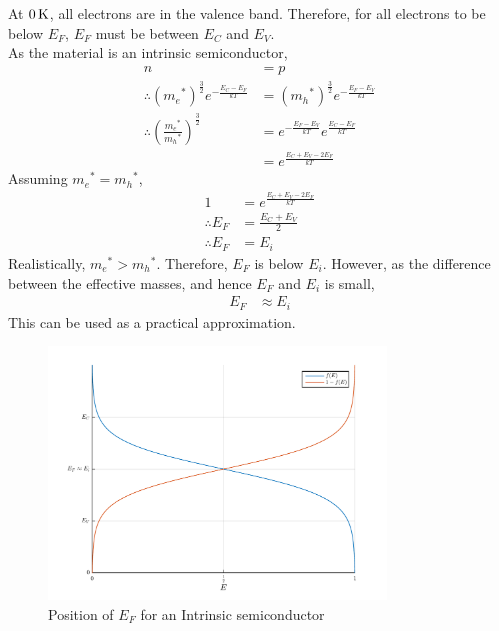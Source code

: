 \documentclass[titlepage, fleqn, a4paper, 12pt, twoside]{article}
\theoremstyle{definition}
\theoremstyle{theorem}
\begin{document}
At $0 \kelvin$, all electrons are in the valence band.
Therefore, for all electrons to be below $E_F$, $E_F$ must be between $E_C$ and $E_V$.\\
As the material is an intrinsic semiconductor,
\begin{align*}
	n                                                                          & = p                                                               \\
	\therefore \left( {m_e}^* \right)^{\frac{3}{2}} e^{-\frac{E_C - E_F}{k T}} & = \left( {m_h}^* \right)^{\frac{3}{2}} e^{-\frac{E_F - E_V}{k T}} \\
	\therefore \left( \frac{{m_e}^*}{{m_h}^*} \right)^{\frac{3}{2}}            & = e^{-\frac{E_F - E_V}{k T}} e^{\frac{E_C - E_F}{k T}}            \\
                                                                                   & = e^{\frac{E_C + E_V - 2 E_F}{k T}}
\end{align*}
Assuming ${m_e}^* = {m_h}^*$,
\begin{align*}
	1              & = e^{\frac{E_C + E_V - 2 E_F}{k T}} \\
	\therefore E_F & = \frac{E_C + E_V}{2}               \\
	\therefore E_F & = E_i
\end{align*}
Realistically, ${m_e}^* > {m_h}^*$.
Therefore, $E_F$ is below $E_i$.
However, as the difference between the effective masses, and hence $E_F$ and $E_i$ is small,
\begin{align*}
	E_F & \approx E_i
\end{align*}
This can be used as a practical approximation.
\begin{figure}[h]
	\centering
	\includegraphics[width = 0.8\textwidth]{./Plots/fermi_function_for_intrinsic.pdf}
	\caption{Position of $E_F$ for an Intrinsic semiconductor}
	\label{fig:Position_of_$E_F$_for_an_Intrinsic_semiconductor}
\end{figure}
\end{document}
